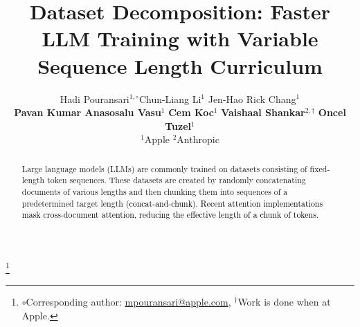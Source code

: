 \documentclass{article}
\title{Dataset Decomposition: Faster LLM Training with Variable Sequence Length Curriculum}
\author{%
Hadi Pouransari$^{1,\circ}$\quad Chun-Liang Li$^{1}$ \quad Jen-Hao Rick Chang$^1$ \\  \textbf{Pavan Kumar Anasosalu Vasu}$^1$ \quad \textbf{Cem Koc}$^1$ \quad \textbf{Vaishaal Shankar}$^{2,\dagger}$ \quad \textbf{Oncel Tuzel}$^1$\\
$^1$Apple \quad $^2$Anthropic\\
}
\newcommand{\revisionred}[1]{\textcolor{black}{#1}}
\begin{document}
\maketitle
\begin{NoHyper}
\footnote[0]{$\circ$Corresponding author: \href{mailto:mpouransari@apple.com}{mpouransari@apple.com}, $^{\dagger}$Work is done when at Apple.}
\end{NoHyper}

\begin{abstract}
  Large language models (LLMs) are commonly trained on datasets consisting of fixed-length token sequences. These datasets are created by randomly concatenating documents of various lengths and then chunking them into sequences of a predetermined target length
  \revisionred{(concat-and-chunk). Recent attention implementations mask cross-document attention, reducing the effective length of a chunk of tokens.}

\end{abstract}
\end{document}
